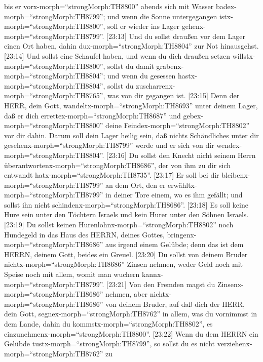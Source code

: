 bis er vorx-morph=``strongMorph:TH8800'' abends sich mit Wasser
badex-morph=``strongMorph:TH8799''; und wenn die Sonne untergegangen
istx-morph=``strongMorph:TH8800'', soll er wieder ins Lager
gehenx-morph=``strongMorph:TH8799''.  {[}23:13{]} Und du
sollst draußen vor dem Lager einen Ort haben, dahin
dux-morph=``strongMorph:TH8804'' zur Not hinausgehst. 
{[}23:14{]} Und sollst eine Schaufel haben, und wenn du dich draußen
setzen willstx-morph=``strongMorph:TH8800'', sollst du damit
grabenx-morph=``strongMorph:TH8804''; und wenn du gesessen
hastx-morph=``strongMorph:TH8804'', sollst du
zuscharrenx-morph=``strongMorph:TH8765'', was von dir gegangen ist.
 {[}23:15{]} Denn der HERR, dein Gott,
wandeltx-morph=``strongMorph:TH8693'' unter deinem Lager, daß er dich
errettex-morph=``strongMorph:TH8687'' und
gebex-morph=``strongMorph:TH8800'' deine
Feindex-morph=``strongMorph:TH8802'' vor dir dahin. Darum soll dein
Lager heilig sein, daß nichts Schändliches unter dir
gesehenx-morph=``strongMorph:TH8799'' werde und er sich von dir
wendex-morph=``strongMorph:TH8804''.  {[}23:16{]} Du sollst
den Knecht nicht seinem Herrn
überantwortenx-morph=``strongMorph:TH8686'', der von ihm zu dir sich
entwandt hatx-morph=``strongMorph:TH8735''.  {[}23:17{]} Er
soll bei dir bleibenx-morph=``strongMorph:TH8799'' an dem Ort, den er
erwähltx-morph=``strongMorph:TH8799'' in deiner Tore einem, wo es ihm
gefällt; und sollst ihn nicht schindenx-morph=``strongMorph:TH8686''.
 {[}23:18{]} Es soll keine Hure sein unter den Töchtern
Israels und kein Hurer unter den Söhnen Israels. 
{[}23:19{]} Du sollst keinen Hurenlohnx-morph=``strongMorph:TH8802''
noch Hundegeld in das Haus des HERRN, deines Gottes,
bringenx-morph=``strongMorph:TH8686'' aus irgend einem Gelübde; denn das
ist dem HERRN, deinem Gott, beides ein Greuel.  {[}23:20{]}
Du sollst von deinem Bruder nichtx-morph=``strongMorph:TH8686'' Zinsen
nehmen, weder Geld noch mit Speise noch mit allem, womit man wuchern
kannx-morph=``strongMorph:TH8799''.  {[}23:21{]} Von den
Fremden magst du Zinsenx-morph=``strongMorph:TH8686'' nehmen, aber
nichtx-morph=``strongMorph:TH8686'' von deinem Bruder, auf daß dich der
HERR, dein Gott, segnex-morph=``strongMorph:TH8762'' in allem, was du
vornimmst in dem Lande, dahin du kommstx-morph=``strongMorph:TH8802'',
es einzunehmenx-morph=``strongMorph:TH8800''.  {[}23:22{]}
Wenn du dem HERRN ein Gelübde tustx-morph=``strongMorph:TH8799'', so
sollst du es nicht verziehenx-morph=``strongMorph:TH8762'' zu
